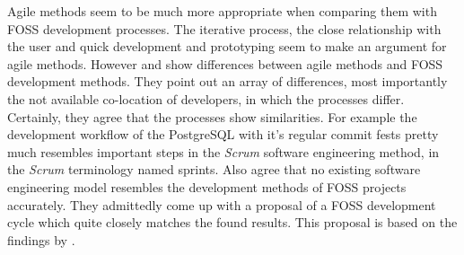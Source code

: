 Agile methods seem to be much more appropriate when comparing them with
\ac{FOSS} development processes. The iterative process, the close relationship
with the user and quick development and prototyping seem to make an argument
for agile methods. However \textcite{Warsta2003} and \textcite{Koch2004} show
differences between agile methods and \ac{FOSS} development methods. They point
out an array of differences, most importantly the not available co-location of
developers, in which the processes differ. Certainly, they agree that the
processes show similarities. For example the development workflow of the
PostgreSQL with it's regular commit fests pretty much resembles important steps
in the \emph{Scrum} software engineering method, in the \emph{Scrum}
terminology named sprints. Also \textcite{Roets2007} agree that no existing
software engineering model resembles the development methods of \ac{FOSS}
projects accurately. They admittedly come up with a proposal of a \ac{FOSS}
development cycle which quite closely matches the found results. This proposal
is based on the findings by \textcite{Jorgensen2001}.


